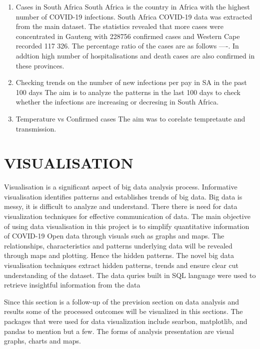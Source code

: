\documentclass[12pt,letterpaper, twoside]{article}
\begin{document}
\begin{enumerate}
    \item Cases in South Africa
    South Africa is the country in Africa with the highest number of  COVID-19 infections. South Africa COVID-19 data was extracted from the main dataset. The statistics revealed that more cases were concentrated in Gauteng with 228756 confirmed cases and Western Cape recorded 117 326.  The percentage ratio of the cases are as follows ----. In addtion high  number of hospitalisations and death cases are also confirmed in these provinces. 
    
    
    \item Checking trends on the number of new infections per pay in SA in the past 100 days
    The aim is to analyze the patterns in the last 100 days  to check whether the infections are increasing or decresing in South Africa.
     
     \item Temperature vs Confirmed cases
     The aim was to corelate tempretaute and transmission. 
    
\end{enumerate}

\section{VISUALISATION}
Visualisation is a significant aspect of big data analysis process. Informative visualisation identifies patterns and establishes trends of big data. Big data is messy, it is difficult to analyze and understand. There there is need for data visualization techniques for effective communication of data. The main objective of using data visualisation in this project is to simplify quantitative information of COVID-19 Open data through visuals such as graphs and maps. The relationships, characteristics and patterns underlying data will be revealed through maps and plotting. Hence the  hidden patterns. The novel big data visualisation techniques extract hidden patterns, trends and ensure clear cut understanding of the dataset. The data quries built in SQL language were used to retrieve insightful information from the data

Since this section is a follow-up of the prevision section on data analysis and results some of the processed outcomes will be visualized in this sections. The packages that were used for data visualization include searbon, matplotlib, and pandas to mention but a few. The forms of analysis presentation are visual graphs, charts and maps. 
\end{document}
